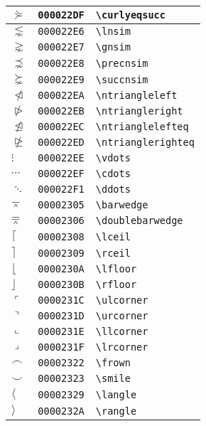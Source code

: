 \begin{longtable}{|l|l|l|}
\hline
$\curlyeqsucc$ & \texttt{000022DF} & \verb|\curlyeqsucc| \\
\hline
$\lnsim$ & \texttt{000022E6} & \verb|\lnsim| \\
\hline
$\gnsim$ & \texttt{000022E7} & \verb|\gnsim| \\
\hline
$\precnsim$ & \texttt{000022E8} & \verb|\precnsim| \\
\hline
$\succnsim$ & \texttt{000022E9} & \verb|\succnsim| \\
\hline
$\ntriangleleft$ & \texttt{000022EA} & \verb|\ntriangleleft| \\
\hline
$\ntriangleright$ & \texttt{000022EB} & \verb|\ntriangleright| \\
\hline
$\ntrianglelefteq$ & \texttt{000022EC} & \verb|\ntrianglelefteq| \\
\hline
$\ntrianglerighteq$ & \texttt{000022ED} & \verb|\ntrianglerighteq| \\
\hline
$\vdots$ & \texttt{000022EE} & \verb|\vdots| \\
\hline
$\cdots$ & \texttt{000022EF} & \verb|\cdots| \\
\hline
$\ddots$ & \texttt{000022F1} & \verb|\ddots| \\
\hline
$\barwedge$ & \texttt{00002305} & \verb|\barwedge| \\
\hline
$\doublebarwedge$ & \texttt{00002306} & \verb|\doublebarwedge| \\
\hline
$\lceil$ & \texttt{00002308} & \verb|\lceil| \\
\hline
$\rceil$ & \texttt{00002309} & \verb|\rceil| \\
\hline
$\lfloor$ & \texttt{0000230A} & \verb|\lfloor| \\
\hline
$\rfloor$ & \texttt{0000230B} & \verb|\rfloor| \\
\hline
$\ulcorner$ & \texttt{0000231C} & \verb|\ulcorner| \\
\hline
$\urcorner$ & \texttt{0000231D} & \verb|\urcorner| \\
\hline
$\llcorner$ & \texttt{0000231E} & \verb|\llcorner| \\
\hline
$\lrcorner$ & \texttt{0000231F} & \verb|\lrcorner| \\
\hline
$\frown$ & \texttt{00002322} & \verb|\frown| \\
\hline
$\smile$ & \texttt{00002323} & \verb|\smile| \\
\hline
$\langle$ & \texttt{00002329} & \verb|\langle| \\
\hline
$\rangle$ & \texttt{0000232A} & \verb|\rangle| \\

\end{longtable}
